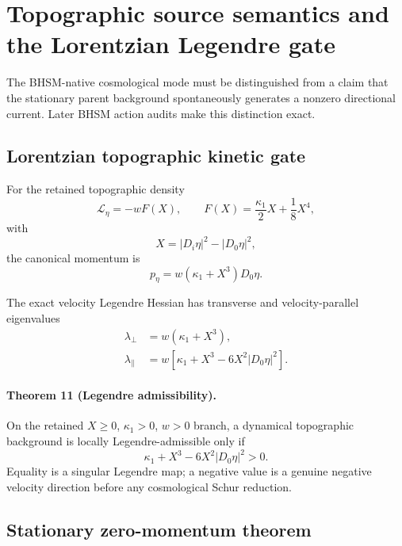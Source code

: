 \section{Topographic source semantics and the Lorentzian Legendre gate}
\label{sec:bhsm-source-legendre}

The BHSM-native cosmological mode must be distinguished from a claim that the
stationary parent background spontaneously generates a nonzero directional
current.  Later BHSM action audits make this distinction exact.

\subsection{Lorentzian topographic kinetic gate}

For the retained topographic density
\begin{equation}
\mathcal L_\eta
=
-wF(X),
\qquad
F(X)
=
\frac{\kappa_1}{2}X+\frac18X^4,
\end{equation}
with
\begin{equation}
X
=
|D_i\eta|^2-|D_0\eta|^2,
\end{equation}
the canonical momentum is
\begin{equation}
p_\eta
=
w(\kappa_1+X^3)D_0\eta .
\end{equation}

The exact velocity Legendre Hessian has transverse and velocity-parallel
eigenvalues
\begin{align}
\lambda_\perp
&=
w(\kappa_1+X^3),
\\
\lambda_\parallel
&=
w\left[
\kappa_1+X^3
-
6X^2|D_0\eta|^2
\right].
\end{align}

\paragraph{Theorem 11 (Legendre admissibility).}
On the retained
$X\ge0$, $\kappa_1>0$, $w>0$ branch, a dynamical topographic background is
locally Legendre-admissible only if
\begin{equation}
\boxed{
\kappa_1+X^3
-
6X^2|D_0\eta|^2
>
0.
}
\label{eq:legendre-cone}
\end{equation}
Equality is a singular Legendre map; a negative value is a genuine negative
velocity direction before any cosmological Schur reduction.

\subsection{Stationary zero-momentum theorem}

